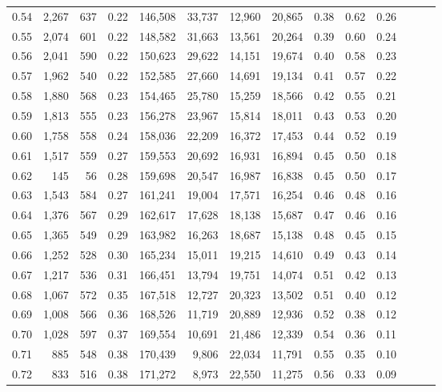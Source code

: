 \begin{tabular}{rrrrrrrrrrrrrr}
0.54 &  2,267 &  637 &  0.22 &  146,508 &   33,737 &  12,960 &  20,865 &  0.38 &  0.62 &      0.26 \\
0.55 &  2,074 &  601 &  0.22 &  148,582 &   31,663 &  13,561 &  20,264 &  0.39 &  0.60 &      0.24 \\
0.56 &  2,041 &  590 &  0.22 &  150,623 &   29,622 &  14,151 &  19,674 &  0.40 &  0.58 &      0.23 \\
0.57 &  1,962 &  540 &  0.22 &  152,585 &   27,660 &  14,691 &  19,134 &  0.41 &  0.57 &      0.22 \\
0.58 &  1,880 &  568 &  0.23 &  154,465 &   25,780 &  15,259 &  18,566 &  0.42 &  0.55 &      0.21 \\
0.59 &  1,813 &  555 &  0.23 &  156,278 &   23,967 &  15,814 &  18,011 &  0.43 &  0.53 &      0.20 \\
0.60 &  1,758 &  558 &  0.24 &  158,036 &   22,209 &  16,372 &  17,453 &  0.44 &  0.52 &      0.19 \\
0.61 &  1,517 &  559 &  0.27 &  159,553 &   20,692 &  16,931 &  16,894 &  0.45 &  0.50 &      0.18 \\
0.62 &    145 &   56 &  0.28 &  159,698 &   20,547 &  16,987 &  16,838 &  0.45 &  0.50 &      0.17 \\
0.63 &  1,543 &  584 &  0.27 &  161,241 &   19,004 &  17,571 &  16,254 &  0.46 &  0.48 &      0.16 \\
0.64 &  1,376 &  567 &  0.29 &  162,617 &   17,628 &  18,138 &  15,687 &  0.47 &  0.46 &      0.16 \\
0.65 &  1,365 &  549 &  0.29 &  163,982 &   16,263 &  18,687 &  15,138 &  0.48 &  0.45 &      0.15 \\
0.66 &  1,252 &  528 &  0.30 &  165,234 &   15,011 &  19,215 &  14,610 &  0.49 &  0.43 &      0.14 \\
0.67 &  1,217 &  536 &  0.31 &  166,451 &   13,794 &  19,751 &  14,074 &  0.51 &  0.42 &      0.13 \\
0.68 &  1,067 &  572 &  0.35 &  167,518 &   12,727 &  20,323 &  13,502 &  0.51 &  0.40 &      0.12 \\
0.69 &  1,008 &  566 &  0.36 &  168,526 &   11,719 &  20,889 &  12,936 &  0.52 &  0.38 &      0.12 \\
0.70 &  1,028 &  597 &  0.37 &  169,554 &   10,691 &  21,486 &  12,339 &  0.54 &  0.36 &      0.11 \\
0.71 &    885 &  548 &  0.38 &  170,439 &    9,806 &  22,034 &  11,791 &  0.55 &  0.35 &      0.10 \\
0.72 &    833 &  516 &  0.38 &  171,272 &    8,973 &  22,550 &  11,275 &  0.56 &  0.33 &      0.09 \\

\end{tabular}
